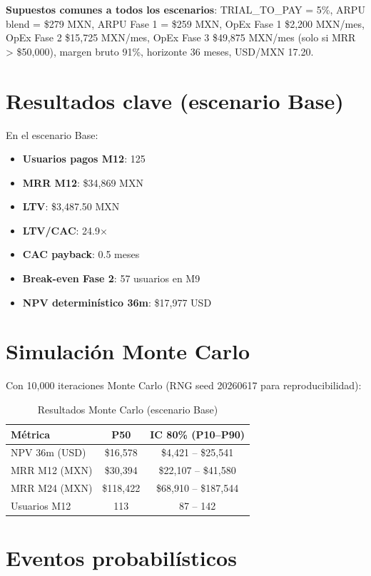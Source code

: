 \documentclass[10pt,a4paper,oneside]{report}
\begin{document}
\textbf{Supuestos comunes a todos los escenarios}: TRIAL\_TO\_PAY = 5\%, ARPU blend = \$279 MXN, ARPU Fase 1 = \$259 MXN, OpEx Fase 1 \$2,200 MXN/mes, OpEx Fase 2 \$15,725 MXN/mes, OpEx Fase 3 \$49,875 MXN/mes (solo si MRR > \$50,000), margen bruto 91\%, horizonte 36 meses, USD/MXN 17.20.

\section{Resultados clave (escenario Base)}
En el escenario Base:

\begin{itemize}[leftmargin=1.4em]
\item \textbf{Usuarios pagos M12}: 125
\item \textbf{MRR M12}: \$34,869 MXN
\item \textbf{LTV}: \$3,487.50 MXN
\item \textbf{LTV/CAC}: 24.9×
\item \textbf{CAC payback}: 0.5 meses
\item \textbf{Break-even Fase 2}: 57 usuarios en M9
\item \textbf{NPV determinístico 36m}: \$17,977 USD
\end{itemize}

\section{Simulación Monte Carlo}
Con 10,000 iteraciones Monte Carlo (RNG seed 20260617 para reproducibilidad):

\begin{table}[H]
\centering
\begin{tabular}{lcc}
\toprule
\textbf{Métrica} & \textbf{P50} & \textbf{IC 80\% (P10--P90)} \\
\midrule
NPV 36m (USD) & \$16,578 & \$4,421 -- \$25,541 \\
MRR M12 (MXN) & \$30,394 & \$22,107 -- \$41,580 \\
MRR M24 (MXN) & \$118,422 & \$68,910 -- \$187,544 \\
Usuarios M12 & 113 & 87 -- 142 \\
\bottomrule
\end{tabular}
\caption{Resultados Monte Carlo (escenario Base)}
\end{table}

\section{Eventos probabilísticos}
\end{document}

